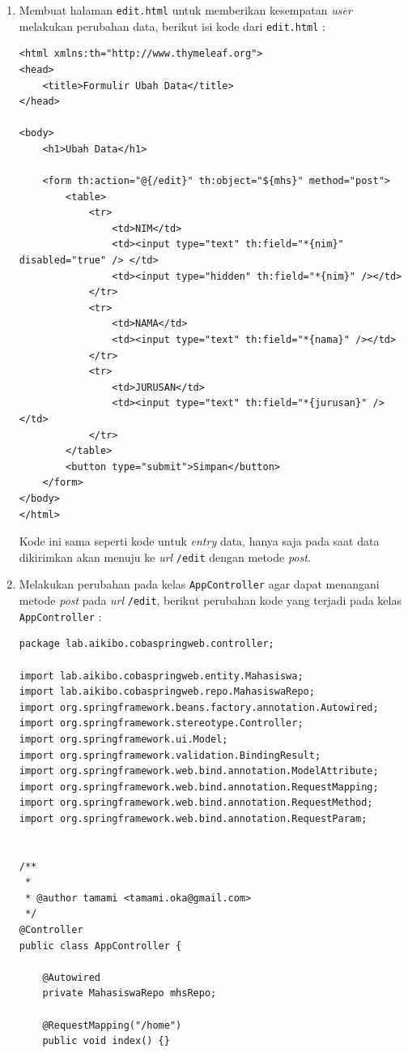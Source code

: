 \begin{enumerate}
	\item Membuat halaman \texttt{edit.html} untuk memberikan kesempatan \textit{user} melakukan perubahan data, berikut isi kode dari \texttt{edit.html} :
	
	\begin{lstlisting}
<html xmlns:th="http://www.thymeleaf.org">
<head>
	<title>Formulir Ubah Data</title>
</head>

<body>
	<h1>Ubah Data</h1>

	<form th:action="@{/edit}" th:object="${mhs}" method="post">
		<table>
			<tr>
				<td>NIM</td>
				<td><input type="text" th:field="*{nim}" disabled="true" /> </td>
				<td><input type="hidden" th:field="*{nim}" /></td>
			</tr>
			<tr>
				<td>NAMA</td>
				<td><input type="text" th:field="*{nama}" /></td>
			</tr>
			<tr>
				<td>JURUSAN</td>
				<td><input type="text" th:field="*{jurusan}" /></td>
			</tr>
		</table>
		<button type="submit">Simpan</button>
	</form>
</body>
</html>
	\end{lstlisting}
	
	Kode ini sama seperti kode untuk \textit{entry} data, hanya saja pada saat data dikirimkan akan menuju ke \textit{url} \texttt{/edit} dengan metode \textit{post}.
	
	\item Melakukan perubahan pada kelas \texttt{AppController} agar dapat menangani metode \textit{post} pada \textit{url} \texttt{/edit}, berikut perubahan kode yang terjadi pada kelas \texttt{AppController} :
	
	\begin{lstlisting}
package lab.aikibo.cobaspringweb.controller;

import lab.aikibo.cobaspringweb.entity.Mahasiswa;
import lab.aikibo.cobaspringweb.repo.MahasiswaRepo;
import org.springframework.beans.factory.annotation.Autowired;
import org.springframework.stereotype.Controller;
import org.springframework.ui.Model;
import org.springframework.validation.BindingResult;
import org.springframework.web.bind.annotation.ModelAttribute;
import org.springframework.web.bind.annotation.RequestMapping;
import org.springframework.web.bind.annotation.RequestMethod;
import org.springframework.web.bind.annotation.RequestParam;


/**
 *
 * @author tamami <tamami.oka@gmail.com>
 */
@Controller
public class AppController {
    
    @Autowired
    private MahasiswaRepo mhsRepo;
    
    @RequestMapping("/home")
    public void index() {}
    

\end{lstlisting}
\end{enumerate}

